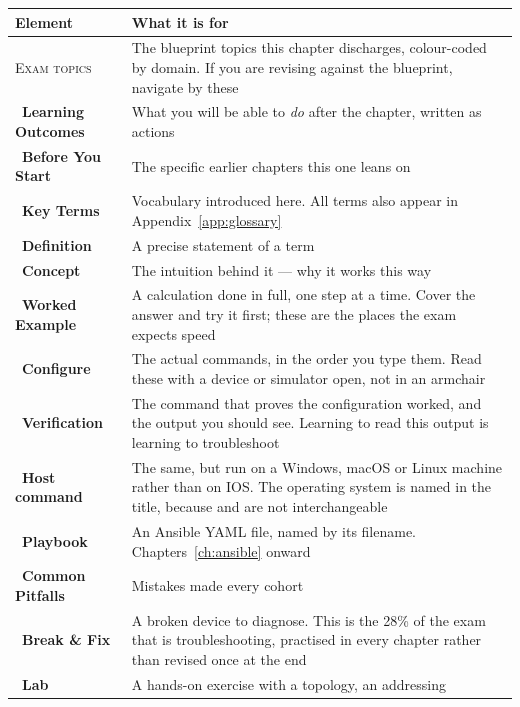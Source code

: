 \begin{longtable}{@{}L{4.6cm}L{10.8cm}@{}}
\toprule
{}
\textbf{Element} & \textbf{What it is for} \\
\midrule
\endhead
{\scriptsize\color{neutral}\textsc{Exam topics}}~ &
The blueprint topics this chapter discharges, colour-coded by domain. If you are
revising against the blueprint, navigate by these \\
~\textbf{Learning Outcomes} & What you will be able to
\emph{do} after the chapter, written as actions \\
~\textbf{Before You Start} & The specific earlier chapters this one
leans on \\
~\textbf{Key Terms} & Vocabulary introduced here. All terms also
appear in Appendix~\ref{app:glossary} \\
~\textbf{Definition} & A precise statement of a term \\
~\textbf{Concept} & The intuition behind it --- why it works
this way \\
~\textbf{Worked Example} & A calculation done in full, one
step at a time. Cover the answer and try it first; these are the places the exam
expects speed \\
~\textbf{Configure} & The actual commands, in the order you
type them. Read these with a device or simulator open, not in an armchair \\
~\textbf{Verification} & The  command that proves the
configuration worked, and the output you should see. Learning to read this output
is learning to troubleshoot \\
~\textbf{Host command} & The same, but run on a Windows, macOS
or Linux machine rather than on IOS. The operating system is named in the title,
because  and  are not interchangeable \\
~\textbf{Playbook} & An Ansible YAML file, named by its
filename. Chapters~\ref{ch:ansible} onward \\
~\textbf{Common Pitfalls} & Mistakes made every
cohort \\
~\textbf{Break \& Fix} & A broken device to diagnose. This is the
28\% of the exam that is troubleshooting, practised in every chapter rather than
revised once at the end \\
~\textbf{Lab} & A hands-on exercise with a topology, an addressing

\end{longtable}
